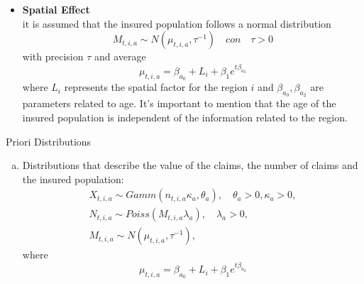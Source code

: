 \documentclass[10pt]{beamer} %
\begin{document}
\begin{frame}
\begin{itemize}
    \item \textbf{Spatial Effect}\\
    it is assumed that the insured population follows a normal distribution $$M_{t,i,a}\sim N(\mu_{t,i,a},\tau^{-1})\quad con \quad \tau>0$$ with precision $\tau$ and average 
\begin{equation}
	\label{mu_t,i,a}
	\mu_{t,i,a}=\beta_{a_0}+L_i+\beta_{1}e^{t\beta_{a_2}}
\end{equation}
 where $L_i$ represents the spatial factor for the region $i$ and $\beta_{a_0},\beta_{a_2}$ are parameters related to age. It's important to mention that the age of the insured population is independent of the information related to the region. 
\end{itemize}
    
\end{frame}
\begin{frame}{Priori Distributions}

\begin{enumerate}[a)]
	\item Distributions that describe the value of the claims, the number of claims and the insured population:
	\begin{align*}
	X_{t,i,a}\sim Gamm(n_{t,i,a}\kappa_{a},\theta_a),\quad \theta_a>0,\kappa_a>0,\\
	N_{t,i,a}\sim Poiss(M_{t,i,a}\lambda_a),\quad \lambda_a>0,\\
	M_{t,i,a}\sim N(\mu_{t,i,a},\tau^{-1}),
	\end{align*}
	where $$\mu_{t,i,a}=\beta_{a_0}+L_i+\beta_1e^{t\beta_{a_2}}$$
	
\end{enumerate}

\end{frame}
\end{document}

